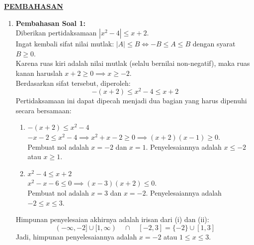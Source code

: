 \documentclass[11pt,openany,a4paper]{article}
\begin{document}


\newpage
{}

\begin{center}
  {\underline{\textbf{\MakeUppercase{Pembahasan}}}}
\end{center}

\begin{enumerate}
  \item \textbf{Pembahasan Soal 1:} \\
        Diberikan pertidaksamaan $|x^2 - 4| \le x + 2$. \\
        Ingat kembali sifat nilai mutlak: $|A| \le B \iff -B \le A \le B$ dengan syarat $B \ge 0$. \\
        Karena ruas kiri adalah nilai mutlak (selalu bernilai non-negatif), maka ruas kanan haruslah $x + 2 \ge 0 \implies x \ge -2$. \\
        Berdasarkan sifat tersebut, diperoleh:
        \[
          -(x + 2) \le x^2 - 4 \le x + 2
        \]
        Pertidaksamaan ini dapat dipecah menjadi dua bagian yang harus dipenuhi secara bersamaan:
        \begin{enumerate}[label=(\roman*)]
          \item $-(x + 2) \le x^2 - 4$ \\
                $-x - 2 \le x^2 - 4 \implies x^2 + x - 2 \ge 0 \implies (x+2)(x-1) \ge 0$. \\
                Pembuat nol adalah $x = -2$ dan $x = 1$. Penyelesaiannya adalah $x \le -2$ atau $x \ge 1$.
          \item $x^2 - 4 \le x + 2$ \\
                $x^2 - x - 6 \le 0 \implies (x-3)(x+2) \le 0$. \\
                Pembuat nol adalah $x = 3$ dan $x = -2$. Penyelesaiannya adalah $-2 \le x \le 3$.
        \end{enumerate}
        Himpunan penyelesaian akhirnya adalah irisan dari (i) dan (ii):
        \[
          (-\infty, -2] \cup [1, \infty) \quad \cap \quad [-2, 3] = \{-2\} \cup [1, 3]
        \]
        Jadi, himpunan penyelesaiannya adalah $x = -2$ atau $1 \le x \le 3$.


\end{enumerate}
\end{document}

